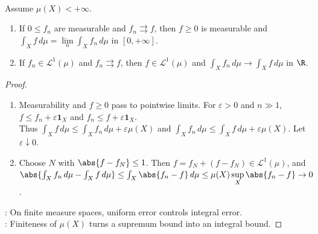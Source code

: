 \begin{proposition} \label{prop:uniform-convergence-finite-measure-integrals} \\
Assume $\mu(X)<+\infty$.
\begin{enumerate}[label=(\roman*)]
\setlength{\itemsep}{0pt}
\item If $0\leq f_n$ are measurable and $f_n\rightrightarrows f$, then $f\geq0$ is measurable and $\int_X f\,d\mu=\lim\limits_n\int_X f_n\,d\mu$ in $[0,+\infty]$.
\item If $f_n\in\mathscr{L}^1(\mu)$ and $f_n\rightrightarrows f$, then $f\in\mathscr{L}^1(\mu)$ and $\int_Xf_n\,d\mu\to\int_Xf\,d\mu$ in $\R$.
\end{enumerate}
\begin{proof}
\begin{enumerate}[label=(\roman*)]
\setlength{\itemsep}{0pt}
\item Measurability and $f\geq0$ pass to pointwise limits. For $\varepsilon>0$ and $n\gg1$, $f\leq f_n+\varepsilon\mathbf{1}_X$ and $f_n\leq f+\varepsilon\mathbf{1}_X$.\\
Thus $\int_X f\,d\mu\leq \int_X f_n\,d\mu+\varepsilon\mu(X)$ and $\int_X f_n\,d\mu\leq \int_X f\,d\mu+\varepsilon\mu(X)$. Let $\varepsilon\downarrow0$.
\item Choose $N$ with $\abs{f-f_N}\leq1$. Then $f=f_N+(f-f_N)\in\mathscr{L}^1(\mu)$, and\\
$\abs{\int_Xf_n\,d\mu-\int_Xf\,d\mu}\leq\int_X\abs{f_n-f}\,d\mu\leq\mu(X)\sup\limits_X\abs{f_n-f}\to0$.
\end{enumerate}
: On finite measure spaces, uniform error controls integral error.\\
: Finiteness of $\mu(X)$ turns a supremum bound into an integral bound.
\end{proof}
\end{proposition}

